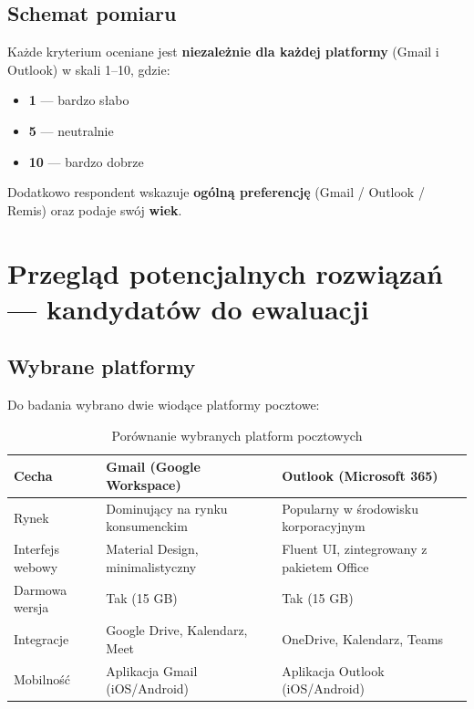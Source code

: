 \documentclass[12pt,a4paper]{article}
\begin{document}
\subsection{Schemat pomiaru}

Każde kryterium oceniane jest \textbf{niezależnie dla każdej platformy} (Gmail i Outlook) w skali 1--10, gdzie:
\begin{itemize}[noitemsep]
    \item \textbf{1} --- bardzo słabo
    \item \textbf{5} --- neutralnie
    \item \textbf{10} --- bardzo dobrze
\end{itemize}

Dodatkowo respondent wskazuje \textbf{ogólną preferencję} (Gmail / Outlook / Remis) oraz podaje swój \textbf{wiek}.

\newpage
\section{Przegląd potencjalnych rozwiązań --- kandydatów do ewaluacji}

\subsection{Wybrane platformy}

Do badania wybrano dwie wiodące platformy pocztowe:

\begin{table}[H]
\centering
\caption{Porównanie wybranych platform pocztowych}
\label{tab:platformy}
\begin{tabularx}{\textwidth}{|X|X|X|}
\hline
\textbf{Cecha} & \textbf{Gmail (Google Workspace)} & \textbf{Outlook (Microsoft 365)} \\
\hline
Rynek & Dominujący na rynku konsumenckim & Popularny w środowisku korporacyjnym \\
\hline
Interfejs webowy & Material Design, minimalistyczny & Fluent UI, zintegrowany z pakietem Office \\
\hline
Darmowa wersja & Tak (15 GB) & Tak (15 GB) \\
\hline
Integracje & Google Drive, Kalendarz, Meet & OneDrive, Kalendarz, Teams \\
\hline
Mobilność & Aplikacja Gmail (iOS/Android) & Aplikacja Outlook (iOS/Android) \\
\hline
\end{tabularx}
\end{table}
\end{document}
